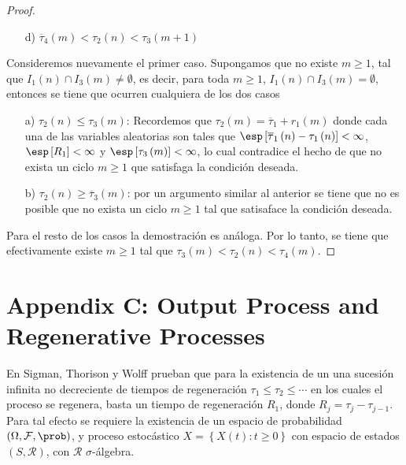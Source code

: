 \begin{proof}
\begin{itemize}
\item[d)] $\overline{\tau}_{4}\left(m\right)<\tau_{2}\left(n\right)
<\tau_{3}\left(m+1\right)$
\end{itemize}

Consideremos nuevamente el primer caso. Supongamos que no existe $m\geq1$, tal que $I_{1}\left(n\right)\cap I_{3}\left(m\right)\neq\emptyset$, es decir, para toda $m\geq1$, $I_{1}\left(n\right)\cap I_{3}\left(m\right)=\emptyset$, entonces se tiene que ocurren cualquiera de los dos casos

\begin{itemize}
\item[a)] $\tau_{2}\left(n\right)\leq\tau_{3}\left(m\right)$: Recordemos que $\tau_{2}\left(m\right)=\overline{\tau}_{1}+r_{1}\left(m\right)$ donde cada una de las variables aleatorias son tales que $\esp\left[\overline{\tau}_{1}\left(n\right)-\tau_{1}\left(n\right)\right]<\infty$, $\esp\left[R_{1}\right]<\infty$ y $\esp\left[\tau_{3}\left(m\right)\right]<\infty$, lo cual contradice el hecho de que no exista un ciclo $m\geq1$ que satisfaga la condici\'on deseada.

\item[b)] $\tau_{2}\left(n\right)\geq\overline{\tau}_{3}\left(m\right)$: por un argumento similar al anterior se tiene que no es posible que no exista un ciclo $m\geq1$ tal que satisaface la condici\'on deseada.

\end{itemize}

Para el resto de los casos la demostraci\'on es an\'aloga. Por lo tanto, se tiene que efectivamente existe $m\geq1$ tal que $\tau_{3}\left(m\right)<\tau_{2}\left(n\right)<\tau_{4}\left(m\right)$.
\end{proof}
\newpage

%
\section{Appendix C: Output Process and Regenerative Processes}
%
En Sigman, Thorison y Wolff \cite{Sigman2} prueban que para la existencia de un una sucesi\'on infinita no decreciente de tiempos de regeneraci\'on $\tau_{1}\leq\tau_{2}\leq\cdots$ en los cuales el proceso se regenera, basta un tiempo de regeneraci\'on $R_{1}$, donde $R_{j}=\tau_{j}-\tau_{j-1}$. Para tal efecto se requiere la existencia de un espacio de probabilidad $\left(\Omega,\mathcal{F},\prob\right)$, y proceso estoc\'astico $\textit{X}=\left\{X\left(t\right):t\geq0\right\}$ con espacio de estados $\left(S,\mathcal{R}\right)$, con $\mathcal{R}$ $\sigma$-\'algebra.

